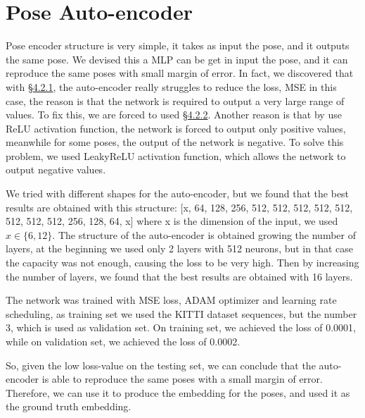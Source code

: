 \section{Pose Auto-encoder}\label{sec:pose-auto-encoder}
Pose encoder structure is very simple, it takes as input the pose, and it outputs the same pose.
We devised this a MLP can be get in input the pose, and it can reproduce the same poses with small margin of error.
In fact, we discovered that with \hyperref[subsec:directly-feeding-the-sequence]{\S4.2.1}, the auto-encoder really struggles to reduce the loss, MSE in this case, the reason is that the network is required to output a very large range of values.
To fix this, we are forced to used \hyperref[subsec:sequence-with-origin]{\S4.2.2}.
Another reason is that by use ReLU activation function, the network is forced to output only positive values, meanwhile for some poses, the output of the network is negative.
To solve this problem, we used LeakyReLU activation function, which allows the network to output negative values.

We tried with different shapes for the auto-encoder, but we found that the best results are obtained with this structure:
[x, 64, 128, 256, 512, 512, 512, 512, 512, 512, 512, 512, 256, 128, 64,  x]
where x is the dimension of the input, we used $x \in \{6, 12\}$.
The structure of the auto-encoder is obtained growing the number of layers, at the beginning we used only 2 layers with 512 neurons, but in that case the capacity was not enough, causing the loss to be very high.
Then by increasing the number of layers, we found that the best results are obtained with 16 layers.

The network was trained with MSE loss, ADAM optimizer and learning rate scheduling, as training set we used the KITTI dataset sequences, but the number 3, which is used as validation set.
On training set, we achieved the loss of 0.0001, while on validation set, we achieved the loss of 0.0002. %

So, given the low loss-value on the testing set, we can conclude that the auto-encoder is able to reproduce the same poses with a small margin of error.
Therefore, we can use it to produce the embedding for the poses, and used it as the ground truth embedding.
